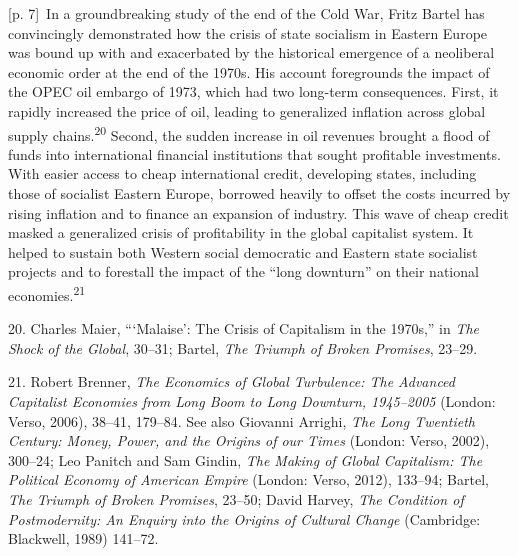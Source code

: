 \documentclass[10pt,a4paper]{article}
\begin{document}
{\scriptsize\color{gray} [p. 7]}\ In a groundbreaking study of the end of the Cold War, Fritz Bartel has convincingly demonstrated how the crisis of state socialism in Eastern Europe was bound up with and exacerbated by the historical emergence of a neoliberal economic order at the end of the 1970s. His account foregrounds the impact of the OPEC oil embargo of 1973, which had two long-term consequences. First, it rapidly increased the price of oil, leading to generalized inflation across global supply chains.\nobreak\textsuperscript{20} Second, the sudden increase in oil revenues brought a flood of funds into international financial institutions that sought profitable investments. With easier access to cheap international credit, developing states, including those of socialist Eastern Europe, borrowed heavily to offset the costs incurred by rising inflation and to finance an expansion of industry. This wave of cheap credit masked a generalized crisis of profitability in the global capitalist system. It helped to sustain both Western social democratic and Eastern state socialist projects and to forestall the impact of the “long downturn” on their national economies.\nobreak\textsuperscript{21}\par{\small 20. Charles Maier, “‘Malaise’: The Crisis of Capitalism in the 1970s,” in \textit{The Shock of the Global}, 30–31; Bartel, \textit{The Triumph of Broken Promises}, 23–29.\par}{\small 21. Robert Brenner, \textit{The Economics of Global Turbulence: The Advanced Capitalist Economies from Long Boom to Long Downturn, 1945–2005} (London: Verso, 2006), 38–41, 179–84. See also Giovanni Arrighi, \textit{The Long Twentieth Century: Money, Power, and the Origins of our Times} (London: Verso, 2002), 300–24; Leo Panitch and Sam Gindin, \textit{The Making of Global Capitalism: The Political Economy of American Empire} (London: Verso, 2012), 133–94; Bartel, \textit{The Triumph of Broken Promises}, 23–50; David Harvey, \textit{The Condition of Postmodernity: An Enquiry into the Origins of Cultural Change} (Cambridge: Blackwell, 1989) 141–72.\par}
\end{document}
